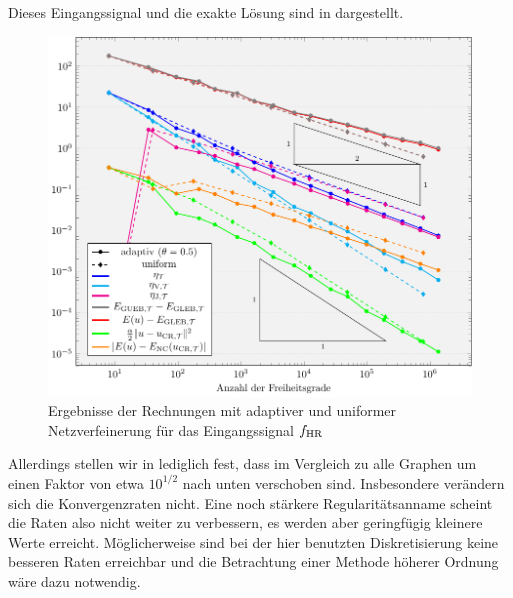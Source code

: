 Dieses Eingangssignal und die exakte Lösung sind in 
dargestellt.
\begin{figure}[p]
  \centering
  \includegraphics[width=.8\linewidth]
    {pictures/chapExperiments/secExactSol/f04/conv.pdf}
  \caption{Ergebnisse der Rechnungen mit adaptiver und uniformer 
    Netzverfeinerung für das Eingangssignal $f_\textup{HR}$}
  \label{fig:f04Convergence}
\end{figure}
Allerdings stellen wir in  lediglich fest, dass im
Vergleich zu  alle Graphen um einen Faktor von etwa
$10^{1/2}$ nach unten verschoben sind.
Insbesondere verändern sich die Konvergenzraten nicht.
Eine noch stärkere Regularitätsanname scheint die Raten also nicht weiter zu
verbessern, es werden aber geringfügig kleinere Werte erreicht.
Möglicherweise sind bei der hier benutzten Diskretisierung keine besseren Raten
erreichbar und die Betrachtung einer Methode höherer Ordnung wäre dazu
notwendig.

